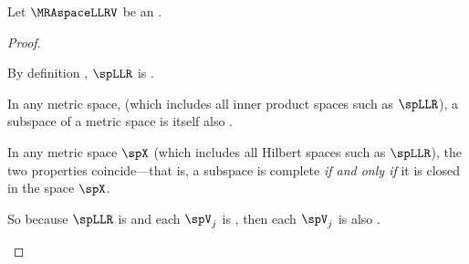 \begin{proposition}
\label{prop:Vn_complete}
Let $\MRAspaceLLRV$ be an .
\end{proposition}
\begin{proof}
\begin{enume}
  \item By definition , $\spLLR$ is .
  \item In any metric space, (which includes all inner product spaces such as $\spLLR$),
        a  subspace of a  metric space is itself also .
  \item In any  metric space $\spX$ (which includes all Hilbert spaces such as $\spLLR$),
        the two properties coincide---that is, a subspace is complete \emph{if and only if}
        it is closed in the space $\spX$.
  \item So because $\spLLR$ is  and each $\spV_j$ is , then each $\spV_j$ is also .
\end{enume}
\end{proof}



